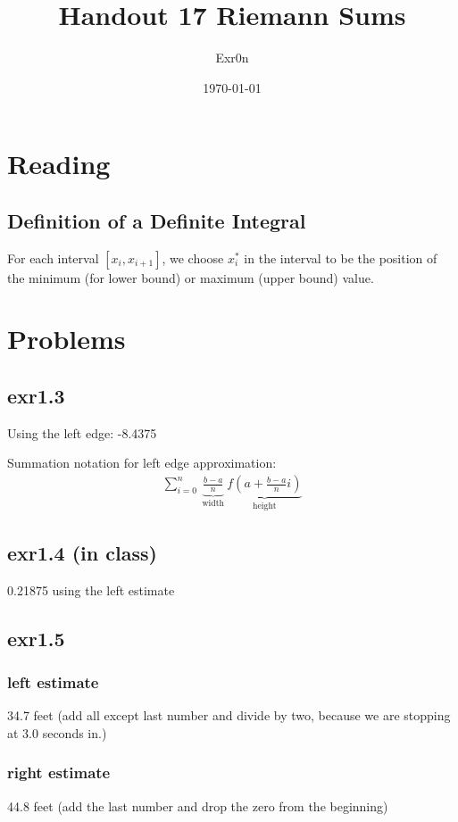 \documentclass[letterpaper]{article}
\author{Exr0n}
\date{\today}
\title{Handout 17 Riemann Sums}
\renewcommand{\tableofcontents}{}
\begin{document}
\tableofcontents


\section{Reading}
\label{sec:org10f4173}
\setcounter{subsubsection}{7}
\subsection{Definition of a Definite Integral}
\label{sec:org9c84218}
For each interval \([x_i, x_{i+1}]\), we choose \(x_i^*\) in the interval to be the position of the minimum (for lower bound) or maximum (upper bound) value.

\section{Problems}
\label{sec:org5ae97e7}

\subsection{exr1.3}
\label{sec:org56257f1}
Using the left edge: -8.4375

Summation notation for left edge approximation:
\[\begin{aligned}
   \sum_{i=0}^n \underbrace{\frac{b-a}{n}}_{\text{ width }} \underbrace{f\left(a+\frac{b-a}{n}i\right)}_\text{ height }
   \end{aligned}\]

\subsection{exr1.4 (in class)}
\label{sec:org0280737}
0.21875 using the left estimate

\subsection{exr1.5}
\label{sec:org1216fb8}

\subsubsection{left estimate}
\label{sec:org812e43c}

34.7 feet (add all except last number and divide by two, because we are stopping at 3.0 seconds in.)

\subsubsection{right estimate}
\label{sec:org9ec909c}
44.8 feet (add the last number and drop the zero from the beginning)
\end{document}
